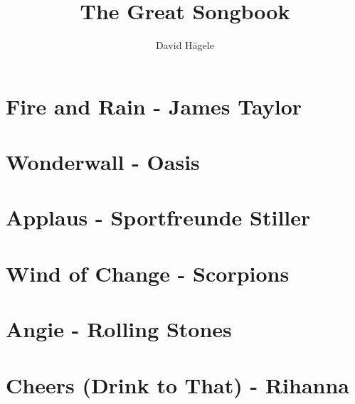 \documentclass[a5paper,onepage,titlepage]{article}
\title{The Great Songbook}
\author{David H\"agele}
\newcommand{\addemptypage}{\newpage\thispagestyle{empty}\mbox{}\newpage}
\begin{document}
\maketitle
\addemptypage
\addemptypage
\tableofcontents
\addemptypage

\section{Fire and Rain - James Taylor}

\newpage

\newpage

\section{Wonderwall - Oasis}

\newpage

\newpage

\section{Applaus - Sportfreunde Stiller}

\newpage

\newpage

\section{Wind of Change - Scorpions}

\newpage

\newpage

\section{Angie - Rolling Stones}

\newpage
\section{Cheers (Drink to That) - Rihanna}

\newpage
\end{document}
